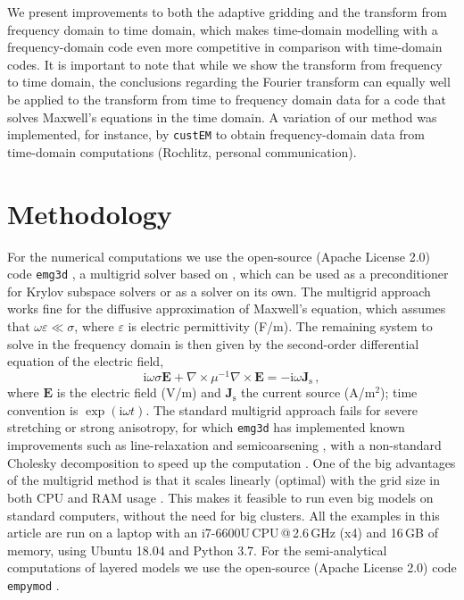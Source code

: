 \documentclass[
    manuscript,
  ]{geophysics}
\newcommand{\emg}[2]{\texttt{emg#1#2}\xspace}
\newcommand{\empymod}{\texttt{empymod}\xspace}
\newcommand{\custem}{\texttt{custEM}\xspace}
\begin{document}
We present improvements to both the adaptive gridding and the transform from
frequency domain to time domain, which makes time-domain modelling with a
frequency-domain code even more competitive in comparison with time-domain
codes. It is important to note that while we show the transform from frequency
to time domain, the conclusions regarding the Fourier transform can equally
well be applied to the transform from time to frequency domain data for a code
that solves Maxwell's equations in the time domain. A variation of our method
was implemented, for instance, by \custem \cite{GEO.19.Rochlitz} to obtain
frequency-domain data from time-domain computations (Rochlitz, personal
communication).

\section{Methodology}

For the numerical computations we use the open-source (Apache License 2.0) code
\emg3d \citep{JOSS.19.Werthmuller}, a multigrid solver based on
\cite{GP.06.Mulder}, which can be used as a preconditioner for Krylov subspace
solvers or as a solver on its own. The multigrid approach works fine for the
diffusive approximation of Maxwell's equation, which assumes that
$\omega\varepsilon \ll \sigma$, where $\varepsilon$ is electric permittivity
(F/m). The remaining system to solve in the frequency domain is then given by
the second-order differential equation of the electric field,
%
\begin{equation}
    \mathrm{i}\omega\sigma \mathbf{E} +
    \nabla \times \mu^{-1} \nabla \times \mathbf{E}
    = -\mathrm{i}\omega\mathbf{J}_\mathrm{s} \, ,
  \label{eq:maxwell}
\end{equation}
%
where $\mathbf{E}$ is the electric field (V/m) and $\mathbf{J}_\mathrm{s}$ the
current source (A/m$^2$); time convention is $\exp(\mathrm{i}\omega t)$. The
standard multigrid approach fails for severe stretching or strong anisotropy,
for which \emg3d has implemented known improvements such as line-relaxation and
semicoarsening \citep{ECCFD.06.Jonsthovel}, with a non-standard Cholesky
decomposition to speed up the computation \citep{GEO.08.Mulder}. One of the big
advantages of the multigrid method is that it scales linearly (optimal) with
the grid size in both CPU and RAM usage \citep{B.Springer.20.Mulder}. This
makes it feasible to run even big models on standard computers, without the
need for big clusters. All the examples in this article are run on a laptop
with an i7-6600U\,CPU\,@\,2.6\,GHz (x4) and 16\,GB of memory, using Ubuntu
18.04 and Python 3.7. For the semi-analytical computations of layered models we
use the open-source (Apache License 2.0) code \empymod
\citep{GEO.17.Werthmuller}.
\end{document}
